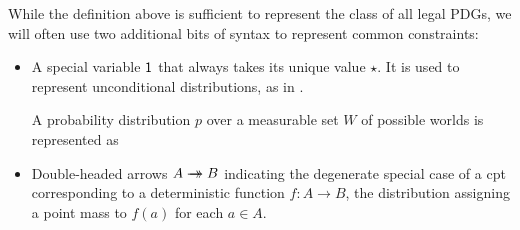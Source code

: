 \documentclass{article}
\newcommand{\doubleheadrightarrow}{%
	\rightarrow\mathrel{\mspace{-15mu}}\rightarrow}
\newcommand{\MN}{PDG}
\newcommand{\MNs}{\MN s}
\numberwithin{equation}{section}
\begin{document}
	While the definition above is sufficient to represent the class of all legal \MNs, 
	we will often use two additional bits of syntax to represent common constraints: 
	\begin{itemize}
		\item A special variable $\sf 1$ that always takes its unique value $\star$. It is used to represent unconditional distributions, as in . 
		\begin{vfull}
		\begin{examplex}\label{ex:worldsonly}
			A probability distribution $p$ over a measurable set $W$ of possible worlds is represented as 
			\begin{center}
			\end{center}
		\end{examplex}
		\end{vfull}
		\item Double-headed arrows $A \doubleheadrightarrow B$ indicating the degenerate special case of a cpt corresponding to a deterministic function $f : A \to B$, the distribution assigning a point mass to $f(a)$ for each $a \in A$.
	\end{itemize}


	
\end{document}
